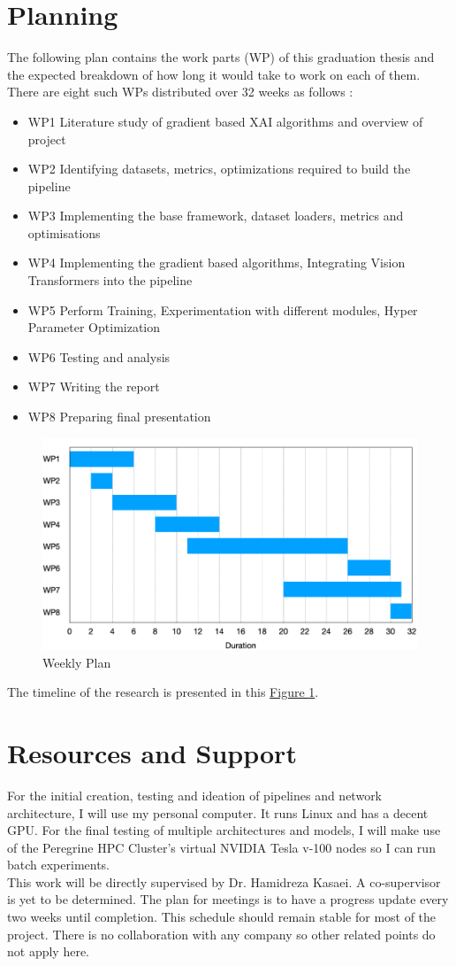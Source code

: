 \section{Planning} \label{section:plan}
The following plan contains the work parts (WP) of this graduation thesis and the expected breakdown of how long it would take to work on each of them. There are eight such WPs distributed over 32 weeks as follows : 
\begin{itemize}
    \item WP1	Literature study of gradient based XAI algorithms and overview of project
    \item WP2	Identifying datasets, metrics, optimizations required to build the pipeline
    \item WP3	Implementing the base framework, dataset loaders, metrics and optimisations
    \item WP4	Implementing the gradient based algorithms, Integrating Vision Transformers into the pipeline
    \item WP5	Perform Training, Experimentation with different modules, Hyper Parameter Optimization
    \item WP6	Testing and analysis
    \item WP7	Writing the report
    \item WP8	Preparing final presentation
\end{itemize}
\begin{figure}[!htbp]
  \centering
  \includegraphics[width=.8\textwidth]{images/gantt_chart.pdf}
  \caption{Weekly Plan}
  \label{fig:plan}
\end{figure}

The timeline of the research is presented in this \hyperref[fig:plan]{Figure \ref{fig:plan}}.

\section{Resources and Support}
For the initial creation, testing and ideation of pipelines and network architecture, I will use my personal computer. It runs Linux and has a decent GPU. For the final testing of multiple architectures and models, I will make use of the Peregrine HPC Cluster's virtual NVIDIA Tesla v-100 nodes so I can run batch experiments.\\
This work will be directly supervised by Dr. Hamidreza Kasaei. A co-supervisor is yet to be determined. The plan for meetings is to have a progress update every two weeks until completion. This schedule should remain stable for most of the project. There is no collaboration with any company so other related points do not apply here.